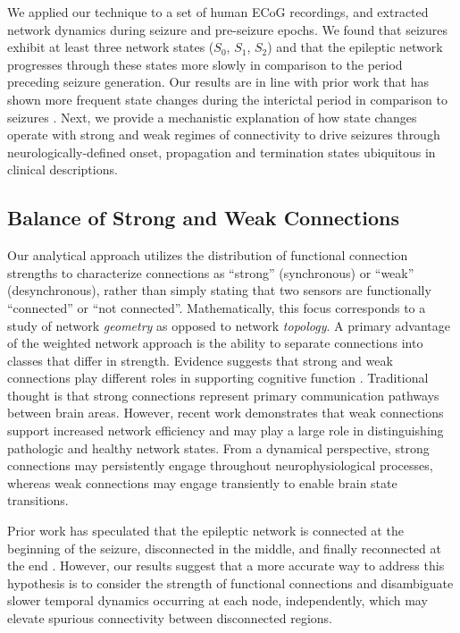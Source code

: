 We applied our technique to a set of human ECoG recordings, and extracted network dynamics during seizure and pre-seizure epochs. We found that seizures exhibit at least three network states ($S_0$, $S_1$, $S_2$) and that the epileptic network progresses through these states more slowly in comparison to the period preceding seizure generation. Our results are in line with prior work that has shown more frequent state changes during the interictal period in comparison to seizures \cite{burns2014network}. Next, we provide a mechanistic explanation of how state changes operate with strong and weak regimes of connectivity to drive seizures through neurologically-defined onset, propagation and termination states ubiquitous in clinical descriptions.

\subsection{Balance of Strong and Weak Connections}
Our analytical approach utilizes the distribution of functional connection strengths to characterize connections as ``strong'' (synchronous) or ``weak'' (desynchronous), rather than simply stating that two sensors are functionally ``connected'' or ``not connected''. Mathematically, this focus corresponds to a study of network \emph{geometry} as opposed to network \emph{topology}. A primary advantage of the weighted network approach is the ability to separate connections into classes that differ in strength. Evidence suggests that strong and weak connections play different roles in supporting cognitive function \cite{schneidman2006weak, santarnecchi2014efficiency}. Traditional thought is that strong connections represent primary communication pathways between brain areas. However, recent work demonstrates that weak connections support increased network efficiency and may play a large role in distinguishing pathologic \cite{bassett2012altered} and healthy \cite{cole2012global, santarnecchi2014efficiency} network states. From a dynamical perspective, strong connections may persistently engage throughout neurophysiological processes, whereas weak connections may engage transiently to enable brain state transitions.

Prior work has speculated that the epileptic network is connected at the beginning of the seizure, disconnected in the middle, and finally reconnected at the end \cite{wendling2003epileptic, schindler2006assessing, kramer2010coalescence}. However, our results suggest that a more accurate way to address this hypothesis is to consider the strength of functional connections and disambiguate slower temporal dynamics occurring at each node, independently, which may elevate spurious connectivity between disconnected regions. 

